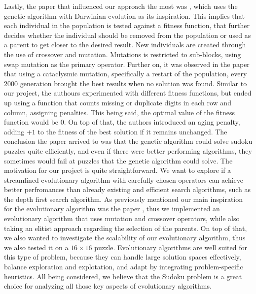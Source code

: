{\newline Lastly, the paper that influenced our approach the most was \cite{Mantere2007}, which uses the genetic algorithm with Darwinian evolution as its inspiration. This implies that each individual in the population is tested against a fitness function, that further decides whether the individual should be removed from the population or used as a parent to get closer to the desired result.
New individuals are created through the use of crossover and mutation. Mutations is restricted to sub-blocks, using swap mutation as the primary operator. Further on, it was observed in the paper that using a cataclysmic mutation, specifically a restart of the population, every 2000 generation brought the best results when no solution was found. Similar to our project, the authours experimented with different fitness functions, but ended up using a function that counts missing or duplicate digits in each row and column, assigning penalties. This being said, the optimal value of the fitness function would be 0. On top of that, the authors introduced an aging penalty, adding $+1$ to the fitness of the best solution if it remains unchanged.
The conclusion the paper arrived to was that the genetic algorithm could solve sudoku puzzles quite efficiently, and even if there were better performing algorithms, they sometimes would fail at puzzles that the genetic algorithm could solve.}
{\newline}
{\newline The motivation for our project is quite straightforward. We want to explore if a streamlined evolutionary algorithm with carefully chosen operators can achieve better perfromances than already existing and efficient search algorithms, such as the depth first search algorithm. As previously mentioned our main inspiration for the evolutionary algorithm was the paper \cite{Mantere2007}, thus we implemented an evolutionary algorithm that uses mutation and crossover operators, while also taking an elitist approach regarding the selection of the parents.
On top of that, we also wanted to investigate the scalability of our evolutionary algorithm, thus we also tested it on a $16 \times 16$ puzzle. Evolutionary algorithms are well suited for this type of problem, because they can handle large solution spaces effectively, balance exploration and explotation, and adapt by integrating problem-specific heuristics.
All being considered, we believe that the Sudoku problem is a great choice for analyzing all those key aspects of evolutionary algorithms.}

